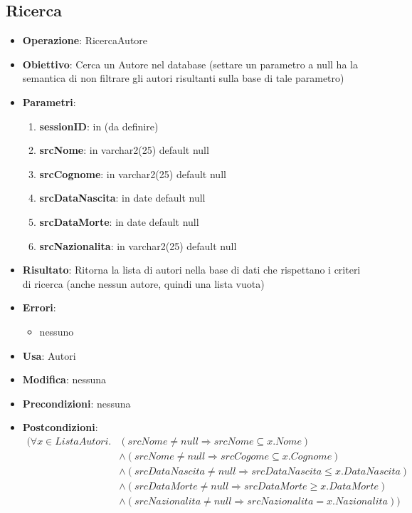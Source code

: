 \documentclass[a4paper,11pt]{article}
\begin{document}
\subsection{Ricerca}
\begin{itemize}
	\item \textbf{Operazione}: RicercaAutore
	\item \textbf{Obiettivo}: Cerca un Autore nel database (settare un parametro a null ha la semantica di non filtrare gli autori risultanti sulla base di tale parametro)
	\item \textbf{Parametri}:
	\begin{enumerate}
		\item \textbf{sessionID}: in (da definire)
		\item \textbf{srcNome}: in varchar2(25) default null
		\item \textbf{srcCognome}: in varchar2(25) default null
		\item \textbf{srcDataNascita}: in date default null
		\item \textbf{srcDataMorte}: in date default null
		\item \textbf{srcNazionalita}: in varchar2(25) default null
	\end{enumerate}
	\item \textbf{Risultato}: Ritorna la lista di autori nella base di dati che rispettano i criteri di ricerca (anche nessun autore, quindi una lista vuota)
	\item \textbf{Errori}: 
	\begin{itemize}
		\item nessuno
	\end{itemize}
	\item \textbf{Usa}: Autori
	\item \textbf{Modifica}: nessuna
	\item \textbf{Precondizioni}: nessuna
	\item \textbf{Postcondizioni}:
 	\begin{align*}
		(\forall x \in ListaAutori.
		& (srcNome \ne null \Rightarrow srcNome \subseteq x.Nome) \\
		& \land (srcNome \ne null \Rightarrow srcCogome \subseteq x.Cognome) \\
		& \land (srcDataNascita \ne null \Rightarrow srcDataNascita \le x.DataNascita) \\
		& \land (srcDataMorte \ne null \Rightarrow srcDataMorte \ge x.DataMorte) \\
		& \land (srcNazionalita \ne null \Rightarrow srcNazionalita = x.Nazionalita))
	\end{align*}
\end{itemize}
\end{document}
